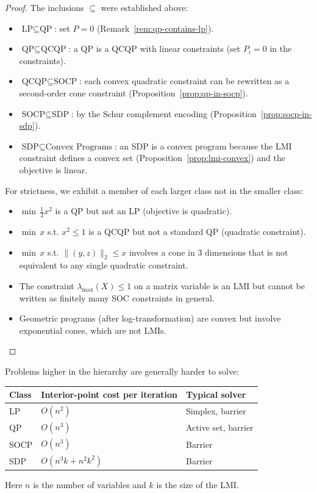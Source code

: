\documentclass[11pt,a4paper]{article}
\begin{document}
\begin{proof}
The inclusions $\subseteq$ were established above:
\begin{itemize}
  \item $\text{LP} \subseteq \text{QP}$: set $P = 0$
    (Remark~\ref{rem:qp-contains-lp}).
  \item $\text{QP} \subseteq \text{QCQP}$: a QP is a QCQP with linear
    constraints (set $P_i = 0$ in the constraints).
  \item $\text{QCQP} \subseteq \text{SOCP}$: each convex quadratic constraint
    can be rewritten as a second-order cone constraint
    (Proposition~\ref{prop:qp-in-socp}).
  \item $\text{SOCP} \subseteq \text{SDP}$: by the Schur complement encoding
    (Proposition~\ref{prop:socp-in-sdp}).
  \item $\text{SDP} \subseteq \text{Convex Programs}$: an SDP is a convex
    program because the LMI constraint defines a convex set
    (Proposition~\ref{prop:lmi-convex}) and the objective is linear.
\end{itemize}
For strictness, we exhibit a member of each larger class not in the
smaller class:
\begin{itemize}
  \item $\min\, \frac{1}{2}x^2$ is a QP but not an LP (objective is
    quadratic).
  \item $\min\, x$ s.t. $x^2 \le 1$ is a QCQP but not a standard QP
    (quadratic constraint).
  \item $\min\, x$ s.t. $\|(y, z)\|_2 \le x$ involves a cone in 3
    dimensions that is not equivalent to any single quadratic constraint.
  \item The constraint $\lambda_{\max}(X) \le 1$ on a matrix variable
    is an LMI but cannot be written as finitely many SOC constraints in
    general.
  \item Geometric programs (after log-transformation) are convex but
    involve exponential cones, which are not LMIs.
\end{itemize}
\end{proof}

\begin{remark}\label{rem:complexity}
Problems higher in the hierarchy are generally harder to solve:
\begin{center}
\begin{tabular}{lll}
\toprule
\textbf{Class} & \textbf{Interior-point cost per iteration} & \textbf{Typical solver} \\
\midrule
LP & $O(n^2)$ & Simplex, barrier \\
QP & $O(n^3)$ & Active set, barrier \\
SOCP & $O(n^3)$ & Barrier \\
SDP & $O(n^3 k + n^2 k^2)$ & Barrier \\
\bottomrule
\end{tabular}
\end{center}
Here $n$ is the number of variables and $k$ is the size of the LMI.
\end{remark}
\end{document}
